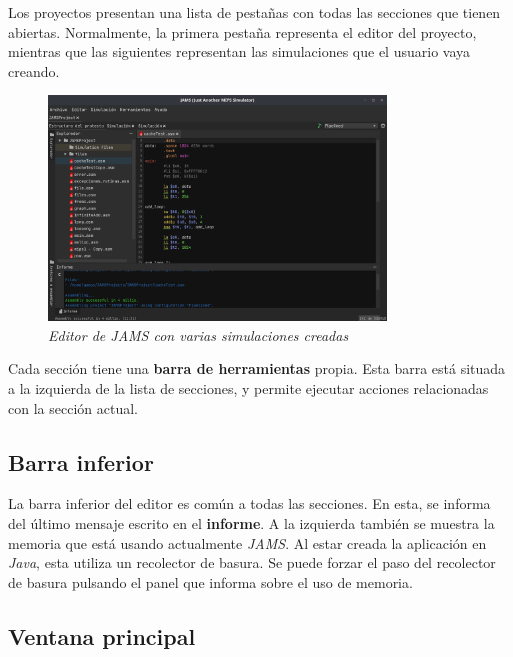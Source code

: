 \noindent Los proyectos presentan una lista de pestañas con todas las secciones
que tienen abiertas.
Normalmente, la primera pestaña representa el editor del proyecto, mientras que
las siguientes representan las simulaciones que el usuario vaya creando.

\begin{figure}[H]
    \centering
    \includegraphics[width=0.8\textwidth]{images/base/jams-sections}
    \caption{\textit{Editor de \textit{JAMS} con varias simulaciones creadas}}
    \label{fig:jams-sections}
\end{figure}

\noindent Cada sección tiene una \textbf{barra de herramientas} propia.
Esta barra está situada a la izquierda de la lista de secciones, y permite
ejecutar acciones relacionadas con la sección actual.

\subsection{Barra inferior}\label{subsec:barra-inferior}

La barra inferior del editor es común a todas las secciones.
En esta, se informa del último mensaje escrito en el \textbf{informe}.
A la izquierda también se muestra la memoria que está usando actualmente
\textit{JAMS}.
Al estar creada la aplicación en \textit{Java}, esta utiliza un recolector
de basura.
Se puede forzar el paso del recolector de basura pulsando el panel que informa
sobre el uso de memoria.

\subsection{Ventana principal}\label{subsec:ventana-principal}


